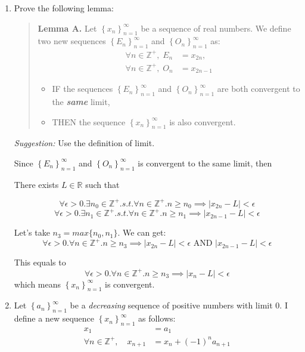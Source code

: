 \documentclass[12pt]{exam}
\newcommand {\DS} [1] {${\displaystyle #1}$}
\newcommand{\vv}{\vspace{.1cm}}
\newcommand{\R}{\mathbb{R}}
\newcommand{\Z}{\mathbb{Z}}
\begin{document}
\begin{enumerate}

\item Prove the following lemma:
	\begin{quotation} \noindent
	{\bf Lemma A.}
		 Let \DS{\left\{x_n\right\}_{n=1}^{\infty}} be a sequence of real numbers.  We define two new sequences \DS{\left\{E_n\right\}_{n=1}^{\infty}} and \DS{\left\{O_n\right\}_{n=1}^{\infty}} as:
			$$
			\begin{aligned}
				\forall n \in \Z^+, \; E_n&=x_{2n}, \\
				\forall n \in \Z^+, \; O_n&=x_{2n-1} 
			\end{aligned}
			$$
		\begin{itemize}
			\item IF the sequences \DS{\left\{E_n\right\}_{n=1}^{\infty}} and \DS{\left\{O_n\right\}_{n=1}^{\infty}} are both convergent to the {\bf \emph{same}} limit,
			\item THEN the sequence \DS{\left\{x_n\right\}_{n=1}^{\infty}} is also convergent.
		\end{itemize}
	\end{quotation}
	\emph{Suggestion:} Use the definition of limit.

\vv

Since \DS{\left\{E_n\right\}_{n=1}^{\infty}} and \DS{\left\{O_n\right\}_{n=1}^{\infty}} is convergent to the same limit, then

There exists $L \in \R$ such that

$$
	\forall \epsilon > 0. \exists n_0 \in \Z^+. s.t. \forall n \in \Z^+. n \geq n_0 \implies | x_{2n} - L | < \epsilon
$$
$$
	\forall \epsilon > 0. \exists n_1 \in \Z^+. s.t. \forall n \in \Z^+. n \geq n_1 \implies | x_{2n-1} - L | < \epsilon
$$

Let's take $n_3 = max\{n_0, n_1\}$.
We can get:
$$
\forall \epsilon > 0. \forall n \in \Z^+. n \geq n_3 \implies | x_{2n} - L | < \epsilon \mbox{ AND } | x_{2n-1} - L | < \epsilon
$$

This equals to
$$
\forall \epsilon > 0. \forall n \in \Z^+. n \geq n_3 \implies | x_n - L | < \epsilon
$$
which means \DS{\left\{x_n\right\}_{n=1}^{\infty}} is convergent.

\item Let \DS{\left\{a_n\right\}_{n=1}^{\infty}} be a \emph{decreasing} sequence of positive numbers with limit $0$.  I define a new sequence \DS{\left\{x_n\right\}_{n=1}^{\infty}} as follows:
	$$
	\begin{aligned}
		x_1 &= a_1 \\
		\forall n \in \Z^+, \quad x_{n+1} &= x_n + (-1)^n a_{n+1}
	\end{aligned}
	$$
	

\end{enumerate}
\end{document}
